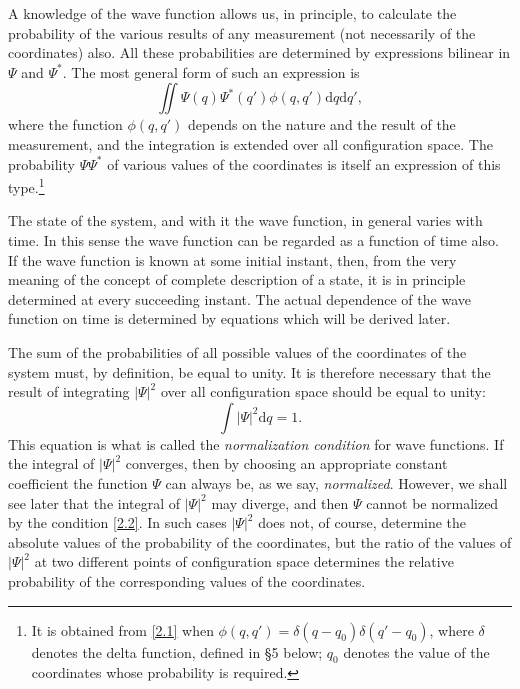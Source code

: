 A knowledge of the wave function allows us, in principle, to calculate the probability of the various results of any measurement (not necessarily of the coordinates) also. All these probabilities are determined by expressions bilinear in $ \Psi $ and $ \Psi^* $. The most general form of such an expression is
\begin{equation}\label{2.1}
\iint\Psi(q)\Psi^*(q')\phi(q,q')\mathrm{d}q\mathrm{d}q',
\end{equation}
where the function $\phi(q, q′)$ depends on the nature and the result of the measurement, and the integration is extended over all configuration space. The probability $ \Psi\Psi^* $ of various values of the coordinates is itself an expression of this type.\footnote{It is obtained from \eqref{2.1} when $\phi(q, q′) = \delta(q-q_0)\delta(q′-q_0)$, where $ \delta $ denotes the delta function, defined in §5 below; $ q_0 $ denotes the value of the coordinates whose probability is required.
}

The state of the system, and with it the wave function, in general varies with time. In this sense the wave function can be regarded as a function of time also. If the wave function is known at some initial instant, then, from the very meaning of the concept of complete description of a state, it is in principle determined at every succeeding instant. The actual dependence of the wave function on time is determined by equations which will be derived later.

The sum of the probabilities of all possible values of the coordinates of the system must, by definition, be equal to unity. It is therefore necessary that the result of integrating $ |\Psi|^2 $ over all configuration space should be equal to unity:
\begin{equation}\label{2.2}
\int|\Psi|^2\mathrm{d}q=1.
\end{equation}
This equation is what is called the \textit{normalization condition} for wave functions. If the integral of $ |\Psi|^2 $ converges, then by choosing an appropriate constant coefficient the function $ \Psi $ can always be, as we say, \textit{normalized}. However, we shall see later that the integral of $ |\Psi|^2 $ may diverge, and then $ \Psi $ cannot be normalized by the condition \eqref{2.2}. In such cases $ |\Psi|^2 $ does not, of course, determine the absolute values of the probability of the coordinates, but the ratio of the values of $ |\Psi|^2 $ at two different points of configuration space determines the relative probability of the corresponding values of the coordinates.

